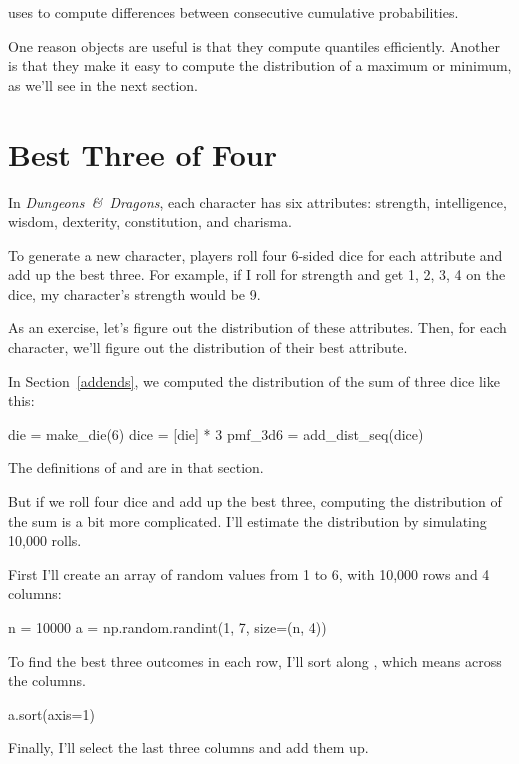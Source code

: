 \documentclass[12pt]{book}
\theoremstyle{exercise}
\begin{document}
 uses  to compute differences between consecutive cumulative probabilities.

One reason  objects are useful is that they compute quantiles efficiently.
Another is that they make it easy to compute the distribution of a maximum or minimum, as we'll see in the next section.


\section{Best Three of Four}

In {\it Dungeons~\&~Dragons}, each character has six attributes: strength, intelligence, wisdom, dexterity, constitution, and charisma.

To generate a new character, players roll four 6-sided dice for each attribute and add up the best three.
For example, if I roll for strength and get 1, 2, 3, 4 on the dice, my character's strength would be 9.

As an exercise, let's figure out the distribution of these attributes.
Then, for each character, we'll figure out the distribution of their best attribute.

In Section~\ref{addends}, we computed the distribution of the sum of three dice like this:

\begin{code}
die = make_die(6)
dice = [die] * 3
pmf_3d6 = add_dist_seq(dice)
\end{code}

The definitions of  and  are in that section.

But if we roll four dice and add up the best three, computing the distribution of the sum is a bit more complicated.
I'll estimate the distribution by simulating 10,000 rolls.

First I'll create an array of random values from 1 to 6, with 10,000 rows and 4 columns:

\begin{code}
n = 10000
a = np.random.randint(1, 7, size=(n, 4))
\end{code}

To find the best three outcomes in each row, I'll sort along , which means across the columns.

\begin{code}
a.sort(axis=1)
\end{code}

Finally, I'll select the last three columns and add them up.
\end{document}
